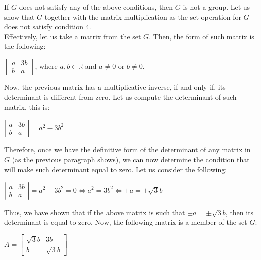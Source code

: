 \documentclass[a4paper,openany,11pt]{book}
\begin{document}
If $G$ does not satisfy any of the above conditions, then $G$ is not a group. Let us show that $G$ together with the matrix multiplication as the set operation for $G$ does not satisfy condition $4$.\\

Effectively, let us take a matrix from the set $G$. Then, the form of such matrix is the following:

\begin{center}
	$\left[\begin{array}{cc}
	a & 3b\\
	b & a
	\end{array}\right]$, \hspace{0.1cm} where $a, b \in \mathbb{R}$ and $a \neq 0$ or $b \neq 0$.
\end{center}

Now, the previous matrix has a multiplicative inverse, if and only if, its determinant is different from zero. Let us compute the determinant of such matrix, this is:

\begin{center}
	$\left|\begin{array}{cc}
	a & 3b\\
	b & a
	\end{array}\right| = a^{2} - 3b^{2}$
\end{center}

Therefore, once we have the definitive form of the determinant of any matrix in $G$ (as the previous paragraph shows), we can now determine the condition that will make such determinant equal to zero. Let us consider the following:

\begin{center}
	$\left|\begin{array}{cc}
	a & 3b\\
	b & a
	\end{array}\right| = a^{2} - 3b^{2} = 0 \iff  a^{2} = 3b^{2} \iff \pm a = \pm\sqrt{3}b$
\end{center} 

Thus, we have shown that if the above matrix is such that $\pm a = \pm\sqrt{3}b$, then its determinant is equal to zero. Now, the following matrix is a member of the set $G$:

\begin{center}
	$A = \left[\begin{array}{cc}
	\sqrt{3}b & 3b\\
	b & \sqrt{3}b
	\end{array}\right]$
\end{center}
\end{document}

